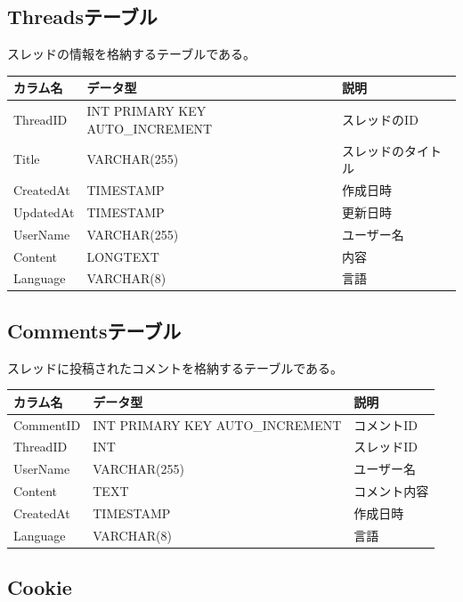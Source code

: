 \documentclass[b5paper,12pt]{jsreport}
\begin{document}
\subsection*{Threadsテーブル}

スレッドの情報を格納するテーブルである。

\begin{adjustbox}{width=\textwidth,center}
	\begin{tabular}{lll}
	\toprule
	\textbf{カラム名} & \textbf{データ型} & \textbf{説明} \\
	\midrule
	ThreadID   & INT PRIMARY KEY AUTO\_INCREMENT & スレッドのID \\
	Title      & VARCHAR(255) & スレッドのタイトル \\
	CreatedAt  & TIMESTAMP & 作成日時 \\
	UpdatedAt  & TIMESTAMP & 更新日時 \\
	UserName   & VARCHAR(255) & ユーザー名 \\
	Content    & LONGTEXT & 内容 \\
	Language   & VARCHAR(8) & 言語 \\
	\bottomrule
	\end{tabular}
\end{adjustbox}

\subsection*{Commentsテーブル}

スレッドに投稿されたコメントを格納するテーブルである。

\begin{adjustbox}{width=\textwidth,center}
	\begin{tabular}{lll}
	\toprule
	\textbf{カラム名} & \textbf{データ型} & \textbf{説明} \\
	\midrule
	CommentID  & INT PRIMARY KEY AUTO\_INCREMENT & コメントID \\
	ThreadID   & INT & スレッドID \\
	UserName   & VARCHAR(255) & ユーザー名 \\
	Content    & TEXT & コメント内容 \\
	CreatedAt  & TIMESTAMP & 作成日時 \\
	Language   & VARCHAR(8) & 言語 \\
	\bottomrule
	\end{tabular}
\end{adjustbox}

\subsection*{Cookie}
\end{document}
